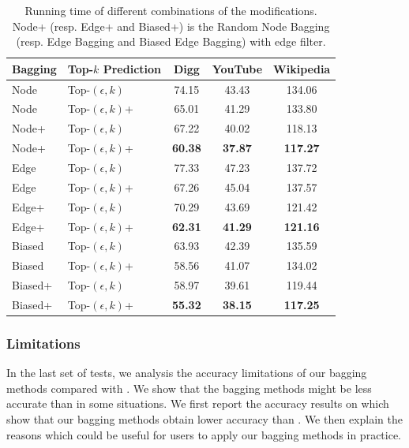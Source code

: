 \begin{table}
\caption{Running time of different combinations of the modifications. Node+
(resp. Edge+ and Biased+) is the Random Node Bagging (resp. Edge Bagging
and Biased Edge Bagging) with edge filter.}
\label{tab_improvements}
\vspace{-2ex}
\centering
\newcommand{\tabincell}[2]{\begin{tabular}{@{}#1@{}}#2\end{tabular}}
\begin{tabular}{l|l|c|c|c}
\hline \hline Bagging & Top-$k$ Prediction & Digg & YouTube & Wikipedia  \\
\hline \hline
Node & Top-$(\epsilon, k)$           & 74.15    & 43.43 & 134.06  \\
Node & Top-$(\epsilon, k)$+        & 65.01    & 41.29 & 133.80 \\
Node+ & Top-$(\epsilon, k)$        & 67.22    & 40.02 & 118.13  \\
Node+ & Top-$(\epsilon, k)$+    & \textbf{60.38}   & \textbf{37.87} & \textbf{117.27} \\
\hline
Edge & Top-$(\epsilon, k)$            & 77.33   & 47.23 & 137.72  \\
Edge & Top-$(\epsilon, k)$+        & 67.26    & 45.04 & 137.57  \\
Edge+ & Top-$(\epsilon, k)$        & 70.29   & 43.69 & 121.42 \\
Edge+ & Top-$(\epsilon, k)$+    & \textbf{62.31}    & \textbf{41.29} & \textbf{121.16} \\
\hline
Biased & Top-$(\epsilon, k)$         & 63.93    & 42.39 & 135.59  \\
Biased & Top-$(\epsilon, k)$+      & 58.56    & 41.07 & 134.02  \\
Biased+ & Top-$(\epsilon, k)$      & 58.97    & 39.61 & 119.44  \\
Biased+ & Top-$(\epsilon, k)$+  & \textbf{55.32}    & \textbf{38.15} & \textbf{117.25}  \\
\hline \hline
\end{tabular}
\end{table}



\subsubsection{Limitations}
In the last set of tests, we analysis the accuracy limitations of our bagging methods
compared with \NMF. We show that the bagging methods might be less accurate
than \NMF in some situations. We first report the accuracy results on \Flickr
which show that our bagging methods obtain lower accuracy than \NMF.
We then explain the reasons which could be useful
for users to apply our bagging methods in practice.

